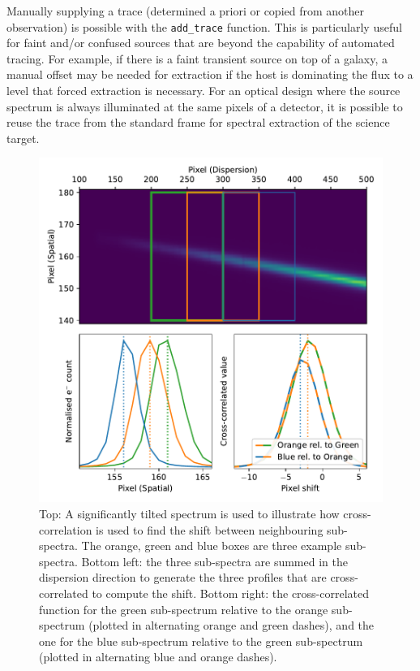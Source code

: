 \documentclass[linenumbers, twocolumn]{aastex631}
\begin{document}
Manually supplying a trace (determined a priori or copied from another observation) is possible with the \texttt{add\_trace}
function. This is particularly useful for faint and/or confused
sources that are beyond the capability of automated tracing. For
example, if there is a faint transient source on top of a galaxy,
a manual offset may be needed for extraction if the host is
dominating the flux to a level that forced extraction is necessary.
For an optical design where the source spectrum is always illuminated
at the same pixels of a detector, it is possible to reuse the trace
from the standard frame for spectral extraction of the science target.

\begin{figure}
    \centering
    \includegraphics[width=\columnwidth]{fig_01_tracing.pdf}
    \caption{Top: A significantly tilted spectrum is used to illustrate how
    cross-correlation is used to find the shift between neighbouring
    sub-spectra. The orange, green and blue boxes are three example
    sub-spectra. Bottom left: the three sub-spectra are summed in
    the dispersion direction to generate the three profiles that are
    cross-correlated to compute the shift. Bottom right: the
    cross-correlated function for the green sub-spectrum relative
    to the orange sub-spectrum (plotted in alternating orange and green dashes), and the one
    for the blue sub-spectrum relative to the green sub-spectrum
    (plotted in alternating blue and orange dashes).}
    \label{fig:trace}
\end{figure}
\end{document}
